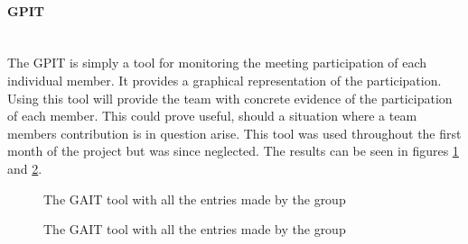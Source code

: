 \paragraph*{GPIT}~\\
The GPIT is simply a tool for monitoring the meeting participation of each individual member. It provides a graphical representation of the participation. Using this tool will provide the team with concrete evidence of the participation of each member. This could prove useful, should a situation where a team members contribution is in question arise. This tool was used throughout the first month of the project but was since neglected. The results can be seen in figures \ref{fig:GPIT} and \ref{fig:GPITGraph}.

\begin{figure}[h!]
	\label{fig:GPIT}
	\caption{The GAIT tool with all the entries made by the group}
\end{figure}

\begin{figure}[h!]
	\label{fig:GPITGraph}
	\caption{The GAIT tool with all the entries made by the group}
\end{figure}